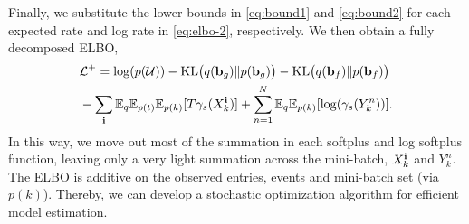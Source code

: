 Finally, we substitute the lower bounds in \eqref{eq:bound1} and \eqref{eq:bound2} for each expected rate and log rate in  \eqref{eq:elbo-2}, respectively. We then obtain a fully decomposed ELBO, 
\begin{align}
&\Lcal^+ =  \log(p(\Ucal)) -\kl\big(q(\b_g) \| p(\b_g)\big) - \kl\big(q(\b_f)\| p(\b_f)\big) \notag \\
& - \sum_{\bi} \EE_q\EE_{p(t)}\EE_{p(k)}[T\gamma_s(X_k^\bi)] + \sum_{n=1}^N \EE_q\EE_{p(k)}[\log(\gamma_s(Y_k^n))]. \label{eq:elbo-3}%
\end{align}
In this way, we move out most of the summation in each softplus and log softplus function, leaving  only a very light summation across the mini-batch, \ie $X_k^{{\bf i}}$ and $Y_k^n$. The ELBO is additive on the observed entries, events and mini-batch set (via $p(k)$). Thereby, we can develop a stochastic optimization algorithm for efficient model estimation. 
\vspace{-0.1in}
